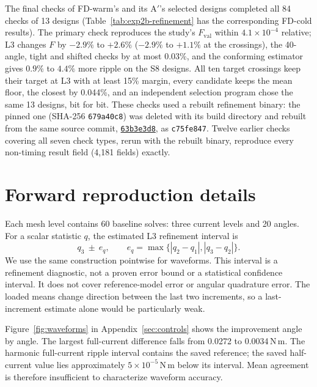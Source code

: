 \documentclass{anvil-paper}
\begin{document}
The final checks of FD-warm's and its A$'$'s selected designs completed all 84
checks of 13 designs (Table~\ref{tab:exp2b-refinement} has the
corresponding FD-cold results). The primary check reproduces the study's
$F_{\mathrm{val}}$ within $4.1\times10^{-4}$ relative; L3 changes $F$ by
$-2.9\%$ to $+2.6\%$ ($-2.9\%$ to $+1.1\%$ at the crossings), the 40-angle,
tight and shifted checks by at most $0.03\%$, and the conforming estimator
gives $0.9\%$ to $4.4\%$ more ripple on the S8 designs. All ten target
crossings keep their target at L3 with at least 15\% margin, every
candidate keeps the mean floor, the closest by 0.044\%, and an independent
selection program chose the same 13 designs, bit for bit. These checks used
a rebuilt refinement binary: the pinned one (SHA-256 \texttt{679a40c8}) was
deleted with its build directory and rebuilt from the same source commit,
\href{https://github.com/rjwalters/geode-fem/commit/63b3e3d8bbc30504f845eebb5b78e8be6a2ee12f}{\texttt{63b3e3d8}}, as \texttt{c75fe847}. Twelve earlier checks covering all
seven check types, rerun with the rebuilt binary, reproduce every
non-timing result field (4,181 fields) exactly.

\begin{table}[H]\centering\small
\caption{Warm-stencil arm: charged time units to the first attaining
validation for A$'$ and FD-warm (repeat~1, FD-warm session units) and their
ratio per start, with the geometric mean.}
\label{tab:exp2c-ratios}
\end{table}

\section{Forward reproduction details}\label{sec:forward}
Each mesh
level contains 60 baseline solves: three current levels and 20 angles. For
a scalar statistic $q$, the estimated L3 refinement interval is
\begin{equation}
 q_3\ \pm\ e_q,\qquad
 e_q=\max\{|q_2-q_1|,|q_3-q_2|\}.
 \label{eq:band}
\end{equation}
We use the same construction pointwise for waveforms. This interval is a
refinement diagnostic, not a proven error bound or a statistical confidence
interval. It does not cover reference-model error or angular quadrature
error. The loaded means change direction between the last two increments,
so a last-increment estimate alone would be particularly weak.

Figure~\ref{fig:waveforms} in Appendix~\ref{sec:controls} shows the improvement angle by angle. The largest
full-current difference falls from 0.0272 to 0.0034\,N\,m. The harmonic
full-current ripple interval contains the saved reference; the saved half-current
value lies approximately $5\times10^{-5}$\,N\,m below its interval.
Mean agreement is therefore insufficient to characterize waveform accuracy.
\end{document}
